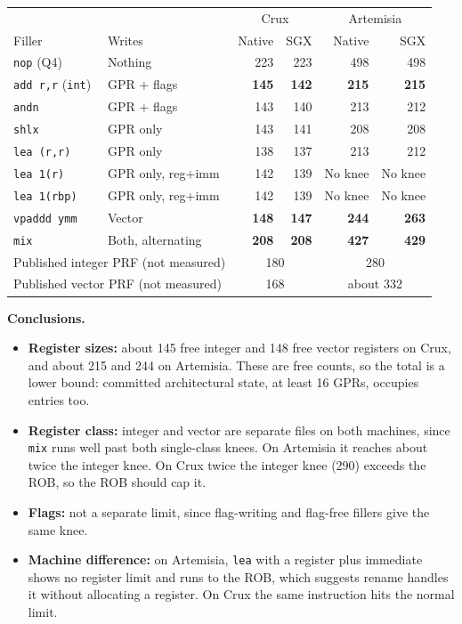 \documentclass[10pt]{article}
\newcommand{\code}[1]{\texttt{#1}}
\begin{document}
\begin{center}
\small
\begin{tabular}{llrrrr}
\toprule
 & & \multicolumn{2}{c}{Crux} & \multicolumn{2}{c}{Artemisia}\\
Filler & Writes & Native & SGX & Native & SGX\\
\midrule
\code{nop} (Q4) & Nothing & 223 & 223 & 498 & 498\\
\code{add r,r} (\code{int}) & GPR + flags & \textbf{145} & \textbf{142} & \textbf{215} & \textbf{215}\\
\code{andn} & GPR + flags & 143 & 140 & 213 & 212\\
\code{shlx} & GPR only & 143 & 141 & 208 & 208\\
\code{lea (r,r)} & GPR only & 138 & 137 & 213 & 212\\
\code{lea 1(r)} & GPR only, reg+imm & 142 & 139 & No knee & No knee\\
\code{lea 1(rbp)} & GPR only, reg+imm & 142 & 139 & No knee & No knee\\
\code{vpaddd ymm} & Vector & \textbf{148} & \textbf{147} & \textbf{244} & \textbf{263}\\
\code{mix} & Both, alternating & \textbf{208} & \textbf{208} & \textbf{427} & \textbf{429}\\
\midrule
\multicolumn{2}{l}{Published integer PRF (not measured)} & \multicolumn{2}{c}{180} & \multicolumn{2}{c}{280}\\
\multicolumn{2}{l}{Published vector PRF (not measured)} & \multicolumn{2}{c}{168} & \multicolumn{2}{c}{about 332}\\
\bottomrule
\end{tabular}
\end{center}

\textbf{Conclusions.}
\begin{itemize}
\item \textbf{Register sizes:} about 145 free integer and 148 free vector registers on Crux, and about 215 and 244 on Artemisia. These
are free counts, so the total is a lower bound: committed architectural state, at least 16 GPRs, occupies entries too.
\item \textbf{Register class:} integer and vector are separate files on both machines, since \code{mix} runs well past both single-class knees. On Artemisia it reaches
about twice the integer knee. On Crux twice the integer knee (290) exceeds the ROB, so the ROB should cap it.
\item \textbf{Flags:} not a separate limit, since flag-writing and flag-free fillers give the same knee.
\item \textbf{Machine difference:} on Artemisia, \code{lea} with a register plus immediate shows no register limit and runs to the ROB, which suggests
rename handles it without allocating a register. On Crux the same instruction hits the normal limit.
\end{itemize}
\end{document}
